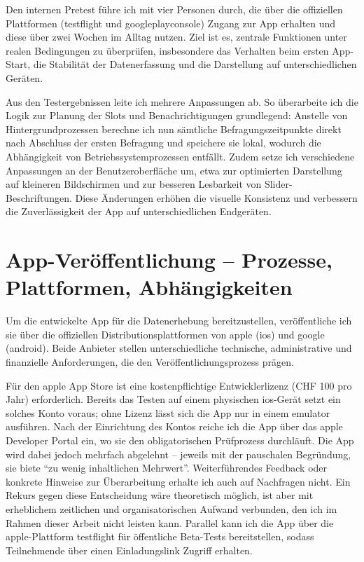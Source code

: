 Den internen Pretest führe ich mit vier Personen durch, die über die offiziellen Plattformen (\gls{testflight} und \gls{googleplayconsole}) Zugang zur App erhalten und diese über zwei Wochen im Alltag nutzen. Ziel ist es, zentrale Funktionen unter realen Bedingungen zu überprüfen, insbesondere das Verhalten beim ersten App-Start, die Stabilität der Datenerfassung und die Darstellung auf unterschiedlichen Geräten. 

Aus den Testergebnissen leite ich mehrere Anpassungen ab. So überarbeite ich die Logik zur Planung der Slots und Benachrichtigungen grundlegend: Anstelle von Hintergrundprozessen berechne ich nun sämtliche Befragungszeitpunkte direkt nach Abschluss der ersten Befragung und speichere sie lokal, wodurch die Abhängigkeit von Betriebssystemprozessen entfällt. Zudem setze ich verschiedene Anpassungen an der Benutzeroberfläche um, etwa zur optimierten Darstellung auf kleineren Bildschirmen und zur besseren Lesbarkeit von Slider-Beschriftungen. Diese Änderungen erhöhen die visuelle Konsistenz und verbessern die Zuverlässigkeit der App auf unterschiedlichen Endgeräten.

\section{App-Veröffentlichung -- Prozesse, Plattformen, Abhängigkeiten}

Um die entwickelte App für die Datenerhebung bereitzustellen, veröffentliche ich sie über die offiziellen Distributionsplattformen von \gls{apple} (\gls{ios}) und \gls{google} (\gls{android}). Beide Anbieter stellen unterschiedliche technische, administrative und finanzielle Anforderungen, die den Veröffentlichungsprozess prägen.

Für den \gls{apple} App Store ist eine kostenpflichtige Entwicklerlizenz (CHF 100 pro Jahr) erforderlich. Bereits das Testen auf einem physischen \gls{ios}-Gerät setzt ein solches Konto voraus; ohne Lizenz lässt sich die App nur in einem \gls{emulator} ausführen. Nach der Einrichtung des Kontos reiche ich die App über das \gls{apple} Developer Portal ein, wo sie den obligatorischen Prüfprozess durchläuft. Die App wird dabei jedoch mehrfach abgelehnt -- jeweils mit der pauschalen Begründung, sie biete \enquote{zu wenig inhaltlichen Mehrwert}. Weiterführendes Feedback oder konkrete Hinweise zur Überarbeitung erhalte ich auch auf Nachfragen nicht. Ein Rekurs gegen diese Entscheidung wäre theoretisch möglich, ist aber mit erheblichem zeitlichen und organisatorischen Aufwand verbunden, den ich im Rahmen dieser Arbeit nicht leisten kann. Parallel kann ich die App über die \gls{apple}-Plattform \gls{testflight} für öffentliche Beta-Tests bereitstellen, sodass Teilnehmende über einen Einladungslink Zugriff erhalten.

